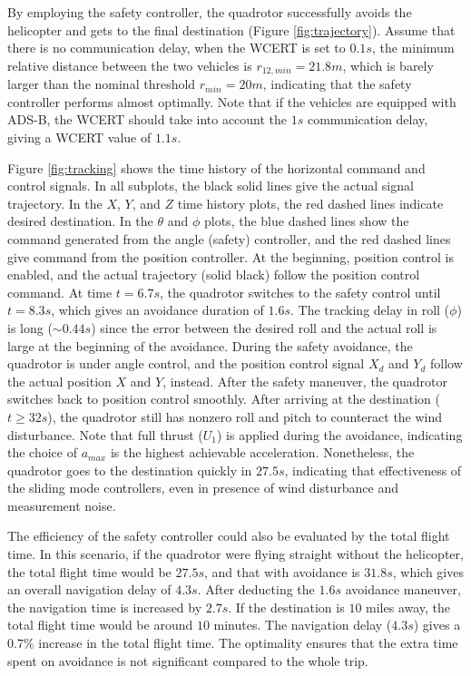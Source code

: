 \documentclass[journal,11pt,onecolumn,draftclsnofoot,]{IEEEtran}
\begin{document}
By employing the safety controller, the quadrotor successfully avoids the helicopter and gets to the final destination (Figure \ref{fig:trajectory}). Assume that there is no communication delay, when the WCERT is set to $0.1s$, the minimum relative distance between the two vehicles is $r_{12,min}=21.8m$, which is barely larger than the nominal threshold $r_{min}=20m$, indicating that the safety controller performs almost optimally. Note that if the vehicles are equipped with ADS-B, the WCERT should take into account the $1s$ communication delay, giving a WCERT value of $1.1s$.

Figure \ref{fig:tracking} shows the time history of the horizontal command and control signals. In all subplots, the black solid lines give the actual signal trajectory. In the $X$, $Y$, and $Z$ time history plots, the red dashed lines indicate desired destination. In the $\theta$ and $\phi$ plots, the blue dashed lines show the command generated from the angle (safety) controller, and the red dashed lines give command from the position controller. At the beginning, position control is enabled, and the actual trajectory (solid black) follow the position control command. At time $t=6.7s$, the quadrotor switches to the safety control until $t=8.3s$, which gives an avoidance duration of $1.6s$. The tracking delay in roll ($\phi$) is long ($\sim 0.44s$) since the error between the desired roll and the actual roll is large at the beginning of the avoidance. During the safety avoidance, the quadrotor is under angle control, and the position control signal $X_d$ and $Y_d$ follow the actual position $X$ and $Y$, instead. After the safety maneuver, the quadrotor switches back to position control smoothly. After arriving at the destination ($t \ge 32 s$), the quadrotor still has nonzero roll and pitch to counteract the wind disturbance. Note that full thrust ($U_1$) is applied during the avoidance, indicating the choice of $a_{max}$ is the highest achievable acceleration. Nonetheless, the quadrotor goes to the destination quickly in $27.5 s$, indicating that effectiveness of the sliding mode controllers, even in presence of wind disturbance and measurement noise.

The efficiency of the safety controller could also be evaluated by the total flight time. In this scenario, if the quadrotor were flying straight without the helicopter, the total flight time would be $27.5 s$, and that with avoidance is $31.8 s$, which gives an overall navigation delay of $4.3 s$. After deducting the $1.6 s$ avoidance maneuver, the navigation time is increased by $2.7 s$. If the destination is $10$ miles away, the total flight time would be around $10$ minutes. The navigation delay ($4.3 s$) gives a $0.7\%$ increase in the total flight time. The optimality ensures that the extra time spent on avoidance is not significant compared to the whole trip.
\end{document}
